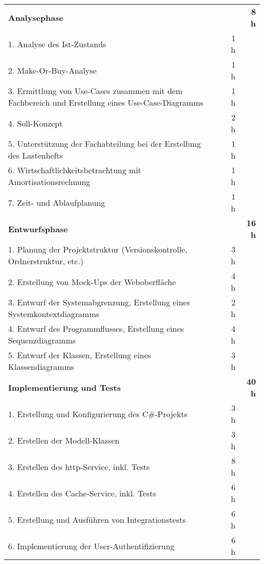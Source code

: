 \begin{tabularx}{\textwidth}{Xrrr}
\rowcolor{heading}\textbf{Analysephase} & \textbf{} & \textbf{} & \textbf{8 h}\\
1. Analyse des Ist-Zustands & & 1 h &\\
\rowcolor{odd}2. Make-Or-Buy-Analyse & & 1 h &\\
3. Ermittlung von Use-Cases zusammen mit dem Fachbereich und Erstellung eines
Use-Case-Diagramms & & 1 h &\\
\rowcolor{odd}4. Soll-Konzept & & 2 h &\\
5. Unterstützung der Fachabteilung bei der Erstellung des Lastenhefts & & 1 h &\\
\rowcolor{odd}6. Wirtschaftlichkeitsbetrachtung mit Amortisationsrechnung & & 1 h &\\
7. Zeit- und Ablaufplanung & & 1 h &\\
\rowcolor{heading}\textbf{Entwurfsphase} & \textbf{} & \textbf{} & \textbf{16 h}\\
1. Planung der Projektstruktur (Versionskontrolle, Ordnerstruktur, etc.) & & 3 h &\\
\rowcolor{odd}2. Erstellung von Mock-Ups der Weboberfläche & & 4 h &\\
3. Entwurf der Systemabgrenzung, Erstellung eines Systemkontextdiagramms & & 2 h &\\
\rowcolor{odd}4. Entwurf des Programmflusses, Erstellung eines Sequenzdiagramms & & 4 h &\\
5. Entwurf der Klassen, Erstellung eines Klassendiagramms & & 3 h &\\
\rowcolor{heading}\textbf{Implementierung und Tests} & \textbf{} & \textbf{} & \textbf{40 h}\\
1. Erstellung und Konfigurierung des C\#-Projekts & & 3 h &\\
\rowcolor{odd}2. Erstellen der Modell-Klassen & & 3 h &\\
3. Erstellen des http-Service, inkl. Tests & & 8 h &\\
\rowcolor{odd}4. Erstellen des Cache-Service, inkl. Tests & & 6 h &\\
5. Erstellung und Ausführen von Integrationstests & & 6 h &\\
\rowcolor{odd}6. Implementierung der User-Authentifizierung & & 6 h &\\

\end{tabularx}

